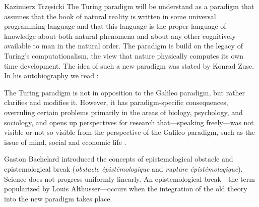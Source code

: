 \begin{artengenv}{Kazimierz Trzęsicki}
The Turing paradigm will be understand as a paradigm that assumes that the book of natural reality is written in some universal programming language  and that this language is the proper language of knowledge about both natural phenomena and about any other cognitively available to man in the natural order. The paradigm is build on the legacy of Turing's computationalism, the view that nature physically computes its own time development. The idea of such a new paradigm was stated by Konrad Zuse. In his autobiography we read \parencite[p.63--64]{Zuse2012a}: 


The Turing paradigm is not in opposition to the Galileo paradigm, but rather clarifies and modifies it. However, it has paradigm-specific consequences, overruling certain problems primarily in the areas of biology, psychology, and sociology, and opens up perspectives for research that---speaking freely---was not visible or not so visible from the perspective of the Galileo paradigm, such as the issue of mind, social and economic life \parencite[chapter 20]{MarciszewskiStacewicz2011}.


Gaston Bachelard \parencite*{Bachelard2002}  introduced the concepts of epistemological obstacle and epistemological break (\textit{obstacle épistémologique} and \textit{rupture épistémologique}). Science does not progress uniformly linearly. An epistemological break---the term popularized by Louis Althusser---occurs when the integration of the old theory into the new paradigm takes place.


\end{artengenv}
